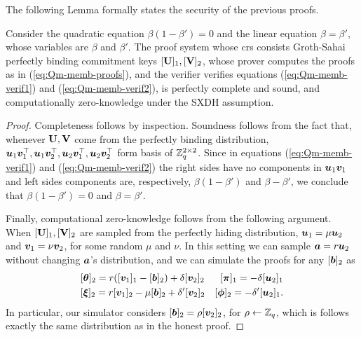  The following Lemma formally states the security of the previous proofs.
\begin{lemma} \label{lemma:Qm-memb}
Consider the quadratic equation $\beta(1-\beta') = 0$ and the linear equation $\beta = \beta'$, whose variables are $\beta$ and $\beta'$. 
The proof system whose crs consists Groth-Sahai perfectly binding commitment keys $[\mathbf{{U}}]_1,[\mathbf{{V}}]_2$, whose prover computes the proofs as in (\ref{eq:Qm-memb-proofs}), and the verifier verifies equations (\ref{eq:Qm-memb-verif1}) and (\ref{eq:Qm-memb-verif2}), is perfectly complete and sound, and computationally zero-knowledge under the SXDH assumption.
\end{lemma}
\begin{proof}
Completeness follows by inspection. Soundness follows from the fact that, whenever $\mathbf{{U}},\mathbf{{V}}$ come from the perfectly binding distribution, ${\boldsymbol{u}}_1{\boldsymbol{v}}_1^\top,{\boldsymbol{u}}_1{\boldsymbol{v}}_2^\top,\allowbreak{\boldsymbol{u}}_2{\boldsymbol{v}}_1^\top,\allowbreak{\boldsymbol{u}}_2{\boldsymbol{v}}_2^\top$ form basis of $\mathbb{Z}_q^{2\times 2}$. Since in equations (\ref{eq:Qm-memb-verif1}) and (\ref{eq:Qm-memb-verif2}) the right sides have no components in ${\boldsymbol{u}}_1{\boldsymbol{v}}_1$ and left sides components are, respectively, $\beta(1-\beta')$ and $\beta-\beta'$, we conclude that $\beta(1-\beta') = 0$ and $\beta=\beta'$.

Finally, computational zero-knowledge follows from the following argument.
When $[\mathbf{{U}}]_1,[\mathbf{{V}}]_2$ are sampled from the perfectly hiding distribution, ${\boldsymbol{u}}_1 = \mu{\boldsymbol{u}}_2$ and ${\boldsymbol{v}}_1 = \nu{\boldsymbol{v}}_2$, for some random $\mu$ and $\nu$. In this setting we can sample ${\boldsymbol{a}} = r{\boldsymbol{u}}_2$ without changing ${\boldsymbol{a}}$'s distribution, and we can simulate the proofs for any $[{\boldsymbol{b}}]_2$ as 
\begin{align} \label{eq:Qm-sim-proofs}
&[{\boldsymbol{\theta}}]_2 = r([{\boldsymbol{v}}_1]_1-[{\boldsymbol{b}}]_2)+\delta[{\boldsymbol{v}}_2]_2
&[{\boldsymbol{\pi}}]_1 = -\delta[{\boldsymbol{u}}_2]_1 \nonumber\\
&[{\boldsymbol{\xi}}]_2 = r[{\boldsymbol{v}}_1]_2-\mu[{\boldsymbol{b}}]_2+\delta'[{\boldsymbol{v}}_2]_2
&[{\boldsymbol{\phi}}]_2 = -\delta'[{\boldsymbol{u}}_2]_1.
\end{align} 
In particular, our simulator considers $[{\boldsymbol{b}}]_2=\rho[{\boldsymbol{v}}_2]_2$, for $\rho\gets\mathbb{Z}_q$, which is follows exactly the same distribution as in the honest proof.


\end{proof}
